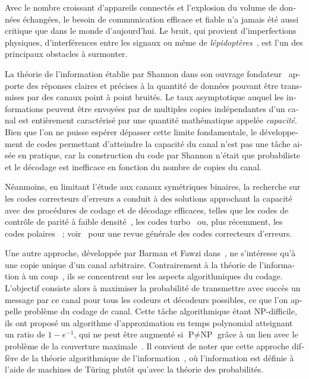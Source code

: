 \begin{otherlanguage}{french}
Avec le nombre croissant d'appareils connectés et l'explosion du volume de données échangées, le besoin de communication efficace et fiable n'a jamais été aussi critique que dans le monde d'aujourd'hui. Le bruit, qui provient d'imperfections physiques, d'interférences entre les signaux ou même de \emph{lépidoptères}~\cite{Hopper81}, est l'un des principaux obstacles à surmonter.

La théorie de l'information établie par Shannon dans son ouvrage fondateur~\cite{Shannon48} apporte des réponses claires et précises à la quantité de données pouvant être transmises par des canaux point à point bruités. Le taux asymptotique auquel les informations peuvent être envoyées par de multiples copies indépendantes d'un canal est entièrement caractérisé par une quantité mathématique appelée \emph{capacité}. Bien que l'on ne puisse espérer dépasser cette limite fondamentale, le développement de codes permettant d'atteindre la capacité du canal n'est pas une tâche aisée en pratique, car la construction du code par Shannon n'était que probabiliste et le décodage est inefficace en fonction du nombre de copies du canal.

Néanmoins, en limitant l'étude aux canaux symétriques binaires, la recherche sur les codes correcteurs d'erreurs a conduit à des solutions approchant la capacité avec des procédures de codage et de décodage efficaces, telles que les codes de contrôle de parité à faible densité~\cite{Gallager62}, les codes turbo~\cite{BG96} ou, plus récemment, les codes polaires~\cite{Arikan09} ; voir~\cite{RU08} pour une revue générale des codes correcteurs d'erreurs.

Une autre approche, développée par Barman et Fawzi dans~\cite{BF18}, ne s'intéresse qu'à une copie unique d'un canal arbitraire. Contrairement à la théorie de l'information à un coup~\cite{RWW06,Tomamichel12,TBR16}, ils se concentrent sur les aspects algorithmiques du codage. L'objectif consiste alors à maximiser la probabilité de transmettre avec succès un message par ce canal pour tous les codeurs et décodeurs possibles, ce que l'on appelle problème du codage de canal. Cette tâche algorithmique étant \textrm{NP}-difficile, ils ont proposé un algorithme d'approximation en temps polynomial atteignant un ratio de $1-e^{-1}$, qui ne peut être augmenté si $\textrm{P}\not=\textrm{NP}$ grâce à un lien avec le problème de la couverture maximale~\cite{Feige98}. Il convient de noter que cette approche diffère de la théorie algorithmique de l'information~\cite{Chaitin77}, où l'information est définie à l'aide de machines de Türing plutôt qu'avec la théorie des probabilités.


\end{otherlanguage}
